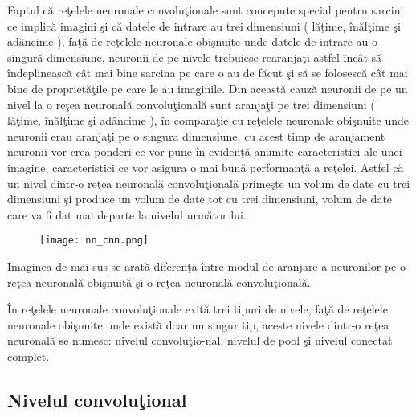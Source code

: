 \par

Faptul c\u{a} re\c{t}elele neuronale convolu\c{t}ionale sunt concepute special pentru sarcini ce implic\u{a} imagini \c{s}i c\u{a} datele de intrare  au trei dimensiuni ( l\u{a}\c{t}ime, \^{i}n\u{a}l\c{t}ime \c{s}i ad\^{a}ncime ),  fa\c{t}\u{a} de re\c{t}elele neuronale obi\c{s}nuite unde datele de intrare au o singur\u{a} dimensiune, neuronii de pe nivele trebuiesc rearanja\c{t}i astfel \^{i}nc\^{a}t s\u{a} \^{i}ndeplineasc\u{a} c\^{a}t mai bine sarcina pe care o au de f\u{a}cut \c{s}i s\u{a} se folosesc\u{a} c\^{a}t mai bine de propriet\u{a}\c{t}ile pe care le au imaginile. Din aceast\u{a} cauz\u{a} neuronii de pe un nivel la o re\c{t}ea neuronal\u{a} convolu\c{t}ional\u{a} sunt aranja\c{t}i pe trei dimensiuni ( l\u{a}\c{t}ime, \^{i}n\u{a}l\c{t}ime \c{s}i ad\^{a}ncime ), \^{i}n compara\c{t}ie cu re\c{t}elele neuronale obi\c{s}nuite unde neuronii erau aranja\c{t}i pe o singura dimensiune, cu acest timp de aranjament neuronii vor crea ponderi ce vor pune \^{i}n eviden\c{t}\u{a} anumite caracteristici ale unei imagine, caracteristici ce vor asigura o mai bun\u{a} performan\c{t}\u{a} a re\c{t}elei. Astfel c\u{a} un nivel dintr-o re\c{t}ea neuronal\u{a} convolu\c{t}ional\u{a} prime\c{s}te un volum de date cu trei dimensiuni \c{s}i produce un volum de date tot cu trei dimensiuni, volum de date care va fi dat mai departe la nivelul urm\u{a}tor lui.

\par 

\begin{figure}[h!]
  \centering
  \texttt{[image: nn\_cnn.png]}
\end{figure}

Imaginea de mai sus se arat\u{a} diferen\c{t}a \^{i}ntre modul de aranjare a neuronilor pe o re\c{t}ea neuronal\u{a} obi\c{s}nuit\u{a} \c{s}i o re\c{t}ea neuronal\u{a} convolu\c{t}ional\u{a}.

\^{I}n re\c{t}elele neuronale convolu\c{t}ionale exit\u{a} trei tipuri de nivele, fa\c{t}\u{a} de re\c{t}elele neuronale obi\c{s}nuite unde exist\u{a} doar un singur tip, aceste nivele dintr-o re\c{t}ea neuronal\u{a} se numesc: nivelul convolu\c{t}io-nal, nivelul de pool \c{s}i nivelul conectat complet.

\subsection{Nivelul convolu\c{t}ional}

